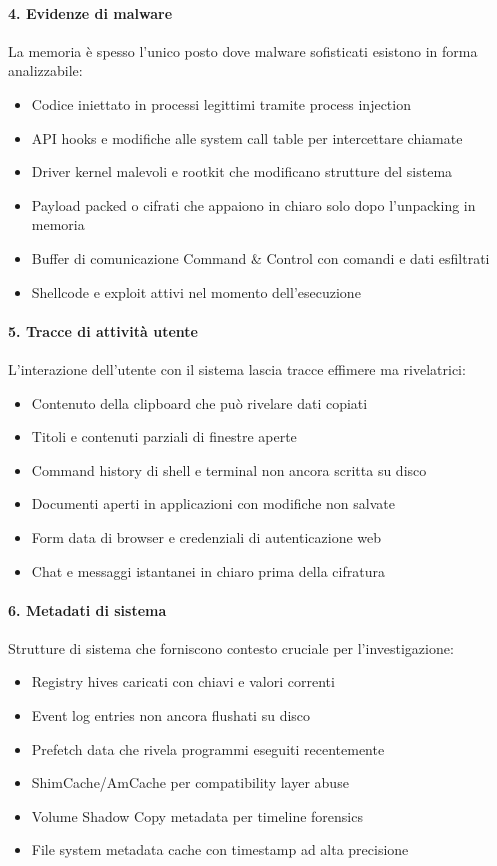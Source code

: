 \paragraph{4. Evidenze di malware}
La memoria è spesso l'unico posto dove malware sofisticati esistono in forma analizzabile:
\begin{itemize}
    \item Codice iniettato in processi legittimi tramite process injection
    \item API hooks e modifiche alle system call table per intercettare chiamate
    \item Driver kernel malevoli e rootkit che modificano strutture del sistema
    \item Payload packed o cifrati che appaiono in chiaro solo dopo l'unpacking in memoria
    \item Buffer di comunicazione Command \& Control con comandi e dati esfiltrati
    \item Shellcode e exploit attivi nel momento dell'esecuzione
\end{itemize}

\paragraph{5. Tracce di attività utente}
L'interazione dell'utente con il sistema lascia tracce effimere ma rivelatrici:
\begin{itemize}
    \item Contenuto della clipboard che può rivelare dati copiati
    \item Titoli e contenuti parziali di finestre aperte
    \item Command history di shell e terminal non ancora scritta su disco
    \item Documenti aperti in applicazioni con modifiche non salvate
    \item Form data di browser e credenziali di autenticazione web
    \item Chat e messaggi istantanei in chiaro prima della cifratura
\end{itemize}

\paragraph{6. Metadati di sistema}
Strutture di sistema che forniscono contesto cruciale per l'investigazione:
\begin{itemize}
    \item Registry hives caricati con chiavi e valori correnti
    \item Event log entries non ancora flushati su disco
    \item Prefetch data che rivela programmi eseguiti recentemente
    \item ShimCache/AmCache per compatibility layer abuse
    \item Volume Shadow Copy metadata per timeline forensics
    \item File system metadata cache con timestamp ad alta precisione
\end{itemize}

